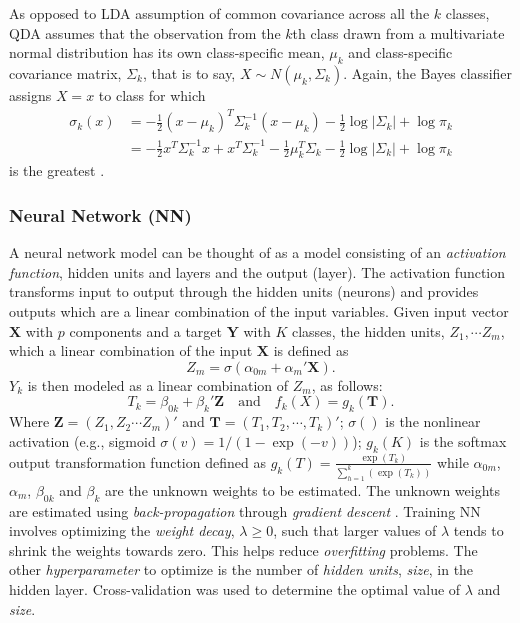 As opposed to LDA assumption of common covariance across all the $k$ classes, QDA assumes that the observation from the $k$th class drawn from a multivariate normal distribution has its own class-specific mean, $\mu_k$ and class-specific covariance matrix, $\Sigma_k$, that is to say, $X\sim N(\mu_k, \Sigma_k)$. Again, the Bayes classifier assigns $X=x$ to class for which
\begin{align*}
\sigma_k(x) &= -\frac{1}{2}(x-\mu_k)^T\Sigma^{-1}_k(x-\mu_k) - \frac{1}{2}\log|\Sigma_k| + \log\pi_k\\
&= -\frac{1}{2}x^T\Sigma^{-1}_kx + x^T\Sigma^{-1}_k - \frac{1}{2}\mu^T_k\Sigma_k - \frac{1}{2}\log|\Sigma_k| + \log\pi_k
\end{align*}
is the greatest \citep{james2013introduction}.

\subsubsection{Neural Network (NN)}
\noindent A neural network model can be thought of as a model consisting of an \textit{activation function}, hidden units and layers and the output (layer). The activation function transforms input to output through the hidden units (neurons) and provides outputs which are a linear combination of the input variables.
\noindent Given input vector $\mathbf{X}$ with $p$ components and a target $\mathbf{Y}$ with $K$ classes, the hidden units, $Z_1, \cdots Z_m$, which a linear combination of the input $\mathbf{X}$ is defined as $$Z_m = \sigma(\alpha_{0m} + \alpha_m'\mathbf{X}).$$ $Y_k$ is then modeled as a linear combination of $Z_m$, as follows: $$T_k = \beta_{0k} + \beta_k'\mathbf{Z} \quad \text{and} \quad f_k(X) = g_k(\mathbf{T}).$$ Where $\mathbf{Z} = (Z_1, Z_2 \cdots Z_m)'$ and $\mathbf{T} = (T_1, T_2, \cdots, T_k)'$; $\sigma()$ is the nonlinear activation (e.g., sigmoid $\sigma(v) = 1/(1-\exp(-v))$); $g_k(K)$ is the softmax output transformation function defined as $g_k(T) = \frac{\exp(T_k)}{\sum_{h=1}^k(\exp(T_k))}$ while $\alpha_{0m}$, $\alpha_m$, $\beta_{0k}$ and $\beta_k$ are the unknown weights to be estimated. The unknown weights are estimated using \textit{back-propagation} through \textit{gradient descent} \cite{trevor2009elements}. Training NN involves optimizing the \textit{weight decay}, $\lambda\geq0$, such that larger values of $\lambda$ tends to shrink the weights towards zero. This helps reduce \textit{overfitting} problems. The other \textit{hyperparameter} to optimize is the number of \textit{hidden units}, \textit{size}, in the hidden layer. Cross-validation was used to determine the optimal value of $\lambda$ and \textit{size}.

